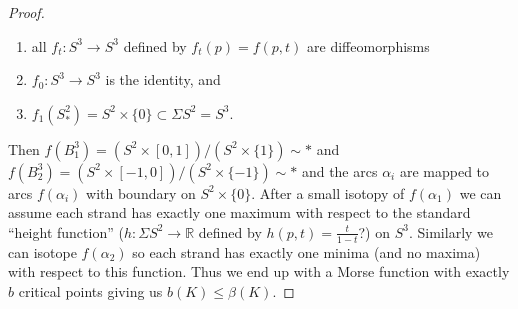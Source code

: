 \documentclass[11pt, oneside]{article}
\begin{document}
\begin{proof}
\begin{enumerate}
\item all $f_{t}: S^{3} \rightarrow S^{3}$ defined by $f_{t}(p) = f(p, t)$ are diffeomorphisms 
\item $f_{0}: S^{3} \rightarrow S^{3}$ is the identity, and 
\item $f_{1}(S^{2}_{*}) = S^{2} \times \{0\} \subset \Sigma S^{2} = S^{3}.$
\end{enumerate}
Then $f(B_{1}^{3}) = (S^{2} \times [0, 1])/ (S^{2} \times \{1\}) \sim *$ and $f(B_{2}^{3}) = (S^{2} \times [-1, 0])/ (S^{2} \times \{-1\}) \sim *$ and the arcs $\alpha_{i}$ are mapped to arcs $f(\alpha_{i})$ with boundary on $S^{2} \times \{0\}.$ After a small isotopy of $f(\alpha_{1})$ we can assume each strand has exactly one maximum with respect to the standard ``height function'' ($h: \Sigma S^{2} \rightarrow \mathbb{R}$ defined by $h(p, t) = \frac{t}{1 - t}$?) on $S^{3}.$ Similarly we can isotope $f(\alpha_{2})$ so each strand has exactly one minima (and no maxima) with respect to this function. Thus we end up with a Morse function with exactly $b$ critical points giving us $b(K) \leq \beta(K).$
\end{proof}  \noindent 
\end{document}
